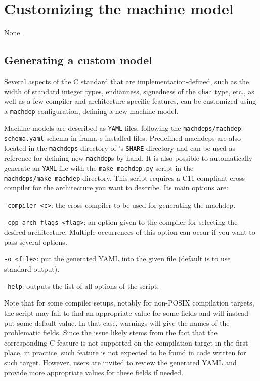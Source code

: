 
\section{Customizing the machine model}\label{sec:customizing-machdep}

\begin{prereq}
  None.
\end{prereq}

\subsection{Generating a custom model}\label{sec:gener-cust-model}
Several aspects of the C standard that are implementation-defined, such as
the width of standard integer types, endianness, signedness of the
\texttt{char} type, etc., as well as a few compiler and architecture specific
features, can be customized using a \texttt{machdep} configuration,
defining a new machine model.

Machine models are described as \texttt{YAML} files, following the
\texttt{machdeps/machdep-schema.yaml} schema in frama-c installed files.
Predefined machdeps are also located in the \texttt{machdeps} directory
of \framac's \texttt{SHARE} directory and can be used as reference for
defining new \texttt{machdep}s by hand. It is also possible to automatically
generate an \texttt{YAML} file with the \texttt{make\_machdep.py} script in
the \texttt{machdeps/make\_machdep} directory. This script requires a
C11-compliant cross-compiler for the architecture you want to describe.
Its main options are:
\begin{description}
\item \texttt{-compiler <c>}: the cross-compiler to be used for generating
  the machdep.
\item \texttt{-cpp-arch-flags <flag>}: an option given to the compiler for
selecting the desired architecture. Multiple occurrences of this option can
occur if you want to pass several options.
\item \texttt{-o <file>}: put the generated YAML into the given file (default
is to use standard output).
\item \texttt{--help}: outputs the list of all options of the script.
\end{description}

Note that for some compiler setups, notably for non-POSIX compilation targets,
the script may fail to find an appropriate value for some fields and will
instead put some default value. In that case, warnings will give the names of
the problematic fields. Since the issue likely stems from the fact that the
corresponding C feature is not supported on the compilation target in the first
place, in practice, such feature is not expected to be found in code written for
such target. However, users are invited to review the generated YAML and
provide more appropriate values for these fields if needed.

